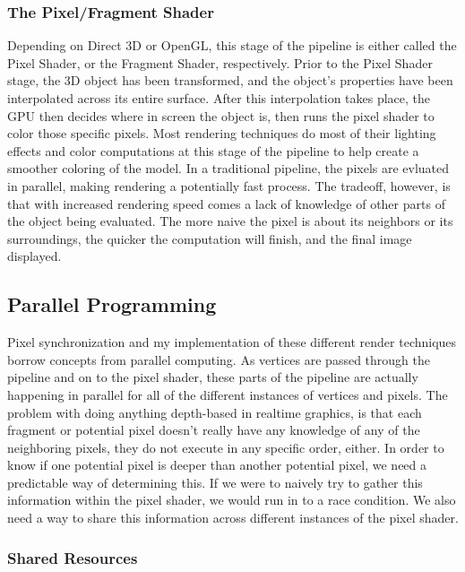 \documentclass[a4paper, 12pt]{article}
\begin{document}
\subsubsection{The Pixel/Fragment Shader}

Depending on Direct 3D or OpenGL, this stage of the pipeline is either called
the Pixel Shader, or the Fragment Shader, respectively. Prior to the Pixel
Shader stage, the 3D object has been transformed, and the object's properties
have been interpolated across its entire surface. After this interpolation
takes place, the GPU then decides where in screen the object is, then runs the
pixel shader to color those specific pixels. Most rendering techniques do most
of their lighting effects and color computations at this stage of the pipeline
to help create a smoother coloring of the model. In a traditional pipeline,
the pixels are evluated in parallel, making rendering a potentially fast
process. The tradeoff, however, is that with increased rendering speed comes a
lack of knowledge of other parts of the object being evaluated. The more naive
the pixel is about its neighbors or its surroundings, the quicker the
computation will finish, and the final image displayed.

\subsection{Parallel Programming}

Pixel synchronization and my implementation of these different render
techniques borrow concepts from parallel computing. As vertices are passed
through the pipeline and on to the pixel shader, these parts of the pipeline
are actually happening in parallel for all of the different instances of
vertices and pixels. The problem with doing anything depth-based in realtime
graphics, is that each fragment or potential pixel doesn't really have any
knowledge of any of the neighboring pixels, they do not execute in any
specific order, either. In order to know if one potential pixel is deeper than
another potential pixel, we need a predictable way of determining this. If we
were to naively try to gather this information within the pixel shader, we
would run in to a race condition. We also need a way to share this information
across different instances of the pixel shader.

\subsubsection{Shared Resources}
\end{document}

